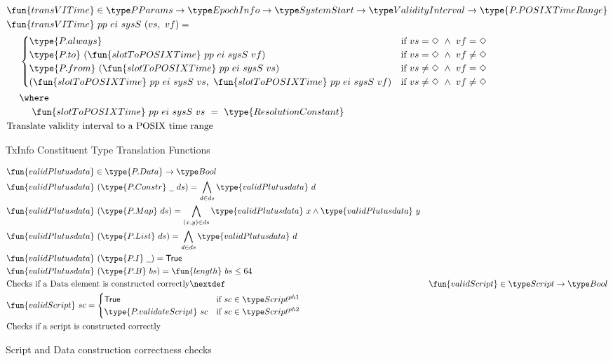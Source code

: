 \begin{figure*}[htb]
\begin{align*}
    & \fun{transVITime} \in \PParams \to \EpochInfo \to \SystemStart \to \ValidityInterval \to \type{P.POSIXTimeRange} \\
    & \fun{transVITime} ~pp ~ei~ sysS~ (vs,~ vf) = \\
    &  ~~~~ \begin{cases}
        \type{P.always} & \text{if } vs = \Nothing ~\wedge~ vf = \Nothing \\
        \type{P.to}~(\fun{slotToPOSIXTime}~pp~ei~sysS~vf) & \text{if } vs = \Nothing ~\wedge~ vf \neq \Nothing \\
        \type{P.from}~(\fun{slotToPOSIXTime}~pp~ei~sysS~vs) & \text{if } vs \neq \Nothing ~\wedge~ vf = \Nothing \\
        (\fun{slotToPOSIXTime}~pp~ei~sysS~vs,~\fun{slotToPOSIXTime}~pp~ei~sysS~vf) & \text{if } vs \neq \Nothing ~\wedge~ vf \neq \Nothing \\
      \end{cases} \\
      & ~~~~\where \\
      & ~~~~~~~~\fun{slotToPOSIXTime}~pp~ei~sysS~vs~=~\type{ResolutionConstant} \\
    & \text{Translate validity interval to a POSIX time range}
  \end{align*}
  \caption{TxInfo Constituent Type Translation Functions}
  \label{fig:txinfo-translations}
\end{figure*}

\begin{figure*}[htb]
  \begin{align*}
    & \fun{validPlutusdata} \in \type{P.Data} \to \Bool \\
    & \fun{validPlutusdata}~ (\type{P.Constr} ~\wcard ~ds) = \bigwedge_{d\in ds} \type{validPlutusdata}~d \\
    & \fun{validPlutusdata}~ (\type{P.Map}~ ds) = \bigwedge_{(x,y)\in ds} \type{validPlutusdata}~x \wedge \type{validPlutusdata}~y \\
    & \fun{validPlutusdata} ~(\type{P.List}~ ds) =  \bigwedge_{d\in ds} \type{validPlutusdata}~d \\
    & \fun{validPlutusdata}~ (\type{P.I}~ \wcard) = \True \\
    & \fun{validPlutusdata}~ (\type{P.B}~ bs) = \fun{length} ~bs \leq 64 \\
    & \text{Checks if a Data element is constructed correctly}
    \nextdef
    & \fun{validScript} \in \Script \to \Bool \\
    & \fun{validScript} ~sc = \begin{cases}
      \True & \text{if $sc \in \ScriptPhOne$} \\
      \type{P.validateScript} ~sc & \text{if $sc \in \ScriptPhTwo$}
    \end{cases} \\
    & \text{Checks if a script is constructed correctly}
  \end{align*}
  \caption{Script and Data construction correctness checks}
  \label{fig:data-script-check}
\end{figure*}

